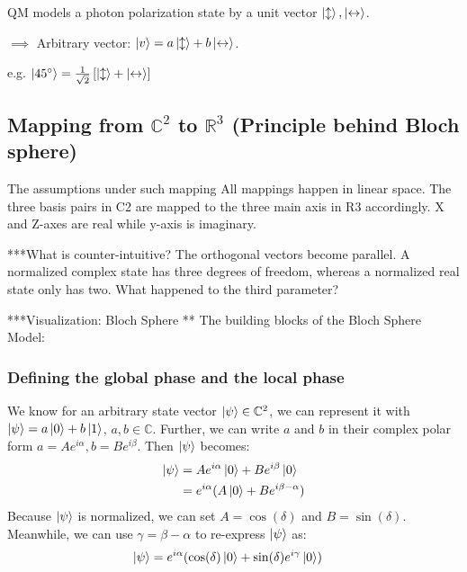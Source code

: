 \documentclass[12pt]{article}
\begin{document}
QM models a photon polarization state by a unit vector $\ket{\updownarrow},
\ket{\leftrightarrow}$.

$\implies$ Arbitrary vector: $\ket{v} = a\ket{\updownarrow} +
b\ket{\leftrightarrow}$.

e.g. $\ket{\SI{45}{\degree}} = \frac{1}{\sqrt{2}}\left[\ket{\updownarrow} +
\ket{\leftrightarrow}\right]$

\newcommand\ketH{\ket{\leftrightarrow}}
\newcommand\ketV{\ket{\updownarrow}}



\subsection{Mapping from $\mathbb{C}^2$ to $\mathbb{R}^3$ (Principle behind Bloch sphere)} 
The assumptions under such mapping
All mappings happen in linear space.
The three basis pairs in C2 are mapped to the three main axis in R3 accordingly. X and Z-axes are real while y-axis is imaginary.

***What is counter-intuitive?
The orthogonal vectors become parallel.
A normalized complex state has three degrees of freedom, whereas a normalized real state only has two. What happened to the third parameter?

***Visualization: Bloch Sphere
** The building blocks of the Bloch Sphere Model: 


\subsubsection{Defining the global phase and the local phase}
We know for an arbitrary state vector $\ket{\psi} \in \mathbb{C}^2$, we can represent it with $\ket{\psi}=a\ket{0}+b\ket{1}$, $a,b\in \mathbb{C}$. Further, we can write $a$ and $b$ in their complex polar form $a=Ae^{i\alpha}, b=Be^{i\beta}$.
Then $\ket{\psi}$ becomes:
\begin{align*}
    \ket{\psi}&=Ae^{i\alpha}\ket{0}+Be^{i\beta}\ket{0}\\
              &=e^{i\alpha}(A\ket{0}+Be^{i{\beta-\alpha}})
\end{align*}
Because $\ket{\psi}$ is normalized, we can set $A=\cos(\delta)$ and $B=\sin(\delta)$. Meanwhile, we can use $\gamma = \beta-\alpha$ to re-express $\ket{\psi}$ as:
\begin{align*}
    \ket{\psi}&=e^{i\alpha}(\cos(\delta)\ket{0}+\sin(\delta)e^{i\gamma}\ket{0})
\end{align*}
\end{document}
